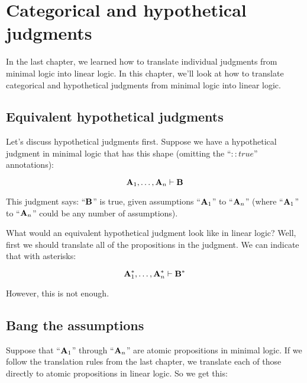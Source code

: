 \documentclass[../../../main.tex]{subfiles}
\begin{document}
\chapter{Categorical and hypothetical judgments}

In the last chapter, we learned how to translate individual judgments from minimal logic into linear logic. In this chapter, we'll look at how to translate categorical and hypothetical judgments from minimal logic into linear logic.


\section{Equivalent hypothetical judgments}

Let's discuss hypothetical judgments first. Suppose we have a hypothetical judgment in minimal logic that has this shape (omitting the ``$:: true$'' annotations):

\begin{equation*}
  \nd{A}_{1}, \ldots, \nd{A}_{n} \ndturnstile/ \nd{B}
\end{equation*}

\noindent
This judgment says: ``$\mathbf{B}$'' is true, given assumptions ``$\mathbf{A}_{1}$'' to ``$\mathbf{A}_{n}$'' (where ``$\mathbf{A}_{1}$'' to ``$\mathbf{A}_{n}$'' could be any number of assumptions). 

What would an equivalent hypothetical judgment look like in linear logic? Well, first we should translate all of the propositions in the judgment. We can indicate that with asterisks:

\begin{equation*}
  \nd{A}_{1}^{*}, \ldots, \nd{A}_{n}^{*} \ndturnstile/ \nd{B}^{*}
\end{equation*}

\noindent
However, this is not enough. 


\section{Bang the assumptions}

Suppose that ``$\mathbf{A}_{1}$'' through ``$\mathbf{A}_{n}$'' are atomic propositions in minimal logic. If we follow the translation rules from the last chapter, we translate each of those directly to atomic propositions in linear logic. So we get this:
\end{document}
